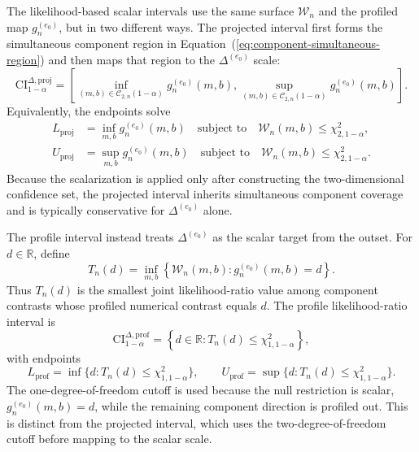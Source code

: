 \documentclass[11pt]{article}
\begin{document}
The likelihood-based scalar intervals use the same surface $\mathcal{W}_n$ and the profiled map $g_n^{(e_0)}$, but in two different ways. The projected interval first forms the simultaneous component region in Equation~(\ref{eq:component-simultaneous-region}) and then maps that region to the $\Delta^{(e_0)}$ scale:
\begin{equation}
  \mathrm{CI}^{\Delta,\mathrm{proj}}_{1-\alpha}
  =
  \left[
    \inf_{(m,b)\in\mathcal{C}_{2,n}(1-\alpha)}
    g_n^{(e_0)}(m,b),
    \sup_{(m,b)\in\mathcal{C}_{2,n}(1-\alpha)}
    g_n^{(e_0)}(m,b)
  \right].
  \label{eq:projected-delta-ci}
\end{equation}
Equivalently, the endpoints solve
\begin{align}
  L_{\mathrm{proj}}
  &=
  \inf_{m,b} g_n^{(e_0)}(m,b)
  \quad\text{subject to}\quad
  \mathcal{W}_n(m,b)\leq\chi^2_{2,1-\alpha},
  \label{eq:projected-delta-lower}\\
  U_{\mathrm{proj}}
  &=
  \sup_{m,b} g_n^{(e_0)}(m,b)
  \quad\text{subject to}\quad
  \mathcal{W}_n(m,b)\leq\chi^2_{2,1-\alpha}.
  \label{eq:projected-delta-upper}
\end{align}
Because the scalarization is applied only after constructing the two-dimensional confidence set, the projected interval inherits simultaneous component coverage and is typically conservative for $\Delta^{(e_0)}$ alone.

The profile interval instead treats $\Delta^{(e_0)}$ as the scalar target from the outset. For $d\in\mathbb{R}$, define
\begin{equation*}
  T_n(d)
  =
  \inf_{m,b}
  \left\{
    \mathcal{W}_n(m,b):
    g_n^{(e_0)}(m,b)=d
  \right\}.
\end{equation*}
Thus $T_n(d)$ is the smallest joint likelihood-ratio value among component contrasts whose profiled numerical contrast equals $d$. The profile likelihood-ratio interval is
\begin{equation}
  \mathrm{CI}^{\Delta,\mathrm{prof}}_{1-\alpha}
  =
  \left\{
    d\in\mathbb{R}:T_n(d)\leq\chi^2_{1,1-\alpha}
  \right\},
  \label{eq:profile-delta-ci}
\end{equation}
with endpoints
\[
  L_{\mathrm{prof}}
  =
  \inf\{d:T_n(d)\leq\chi^2_{1,1-\alpha}\},
  \qquad
  U_{\mathrm{prof}}
  =
  \sup\{d:T_n(d)\leq\chi^2_{1,1-\alpha}\}.
\]
The one-degree-of-freedom cutoff is used because the null restriction is scalar, $g_n^{(e_0)}(m,b)=d$, while the remaining component direction is profiled out. This is distinct from the projected interval, which uses the two-degree-of-freedom cutoff before mapping to the scalar scale.
\end{document}
